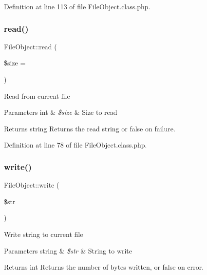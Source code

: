 Definition at line 113 of file File\+Object.\+class.\+php.

\mbox{\label{classFileObject_af345fcd2d619a3e13b1f95f744964617}} 
\subsubsection{\texorpdfstring{read()}{read()}}
{\footnotesize\ttfamily File\+Object\+::read (\begin{DoxyParamCaption}\item[{}]{\$size = {} }\end{DoxyParamCaption})}

Read from current file


\begin{DoxyParams}[1]{Parameters}
int & {\em \$size} & Size to read \\
\hline
\end{DoxyParams}
\begin{DoxyReturn}{Returns}
string Returns the read string or false on failure. 
\end{DoxyReturn}


Definition at line 78 of file File\+Object.\+class.\+php.

\mbox{\label{classFileObject_a6bfe97d0df5b57183c0816fb013b7fb2}} 
\subsubsection{\texorpdfstring{write()}{write()}}
{\footnotesize\ttfamily File\+Object\+::write (\begin{DoxyParamCaption}\item[{}]{\$str }\end{DoxyParamCaption})}

Write string to current file


\begin{DoxyParams}[1]{Parameters}
string & {\em \$str} & String to write \\
\hline
\end{DoxyParams}
\begin{DoxyReturn}{Returns}
int Returns the number of bytes written, or false on error. 
\end{DoxyReturn}


